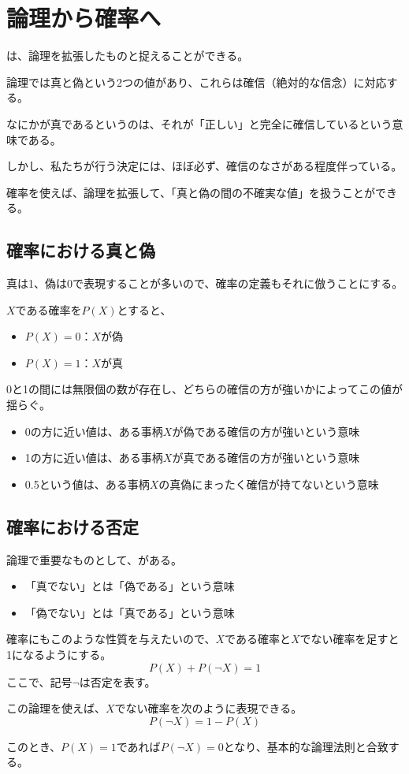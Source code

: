 \documentclass[../../../topic_statistics]{subfiles}
\begin{document}
\sectionline
\section{論理から確率へ}

は、論理を拡張したものと捉えることができる。

\br

論理では真と偽という2つの値があり、これらは確信（絶対的な信念）に対応する。

なにかが真であるというのは、それが「正しい」と完全に確信しているという意味である。

\br

しかし、私たちが行う決定には、ほぼ必ず、確信のなさがある程度伴っている。

確率を使えば、論理を拡張して、「真と偽の間の不確実な値」を扱うことができる。

\subsection{確率における真と偽}

真は1、偽は0で表現することが多いので、確率の定義もそれに倣うことにする。

\br

$X$である確率を$P(X)$とすると、
\begin{itemize}
  \item $P(X) = 0$：$X$が偽
  \item $P(X) = 1$：$X$が真
\end{itemize}

0と1の間には無限個の数が存在し、どちらの確信の方が強いかによってこの値が揺らぐ。

\begin{itemize}
  \item 0の方に近い値は、ある事柄$X$が偽である確信の方が強いという意味
  \item 1の方に近い値は、ある事柄$X$が真である確信の方が強いという意味
  \item 0.5という値は、ある事柄$X$の真偽にまったく確信が持てないという意味
\end{itemize}

\subsection{確率における否定}

論理で重要なものとして、がある。

\begin{itemize}
  \item 「真でない」とは「偽である」という意味
  \item 「偽でない」とは「真である」という意味
\end{itemize}

確率にもこのような性質を与えたいので、$X$である確率と$X$でない確率を足すと1になるようにする。
\begin{equation*}
  P(X) + P(\lnot X) = 1
\end{equation*}
ここで、記号$\lnot$は否定を表す。

\br

この論理を使えば、$X$でない確率を次のように表現できる。
\begin{equation*}
  P(\lnot X) = 1 - P(X)
\end{equation*}

このとき、$P(X) = 1$であれば$P(\lnot X) = 0$となり、基本的な論理法則と合致する。
\end{document}

